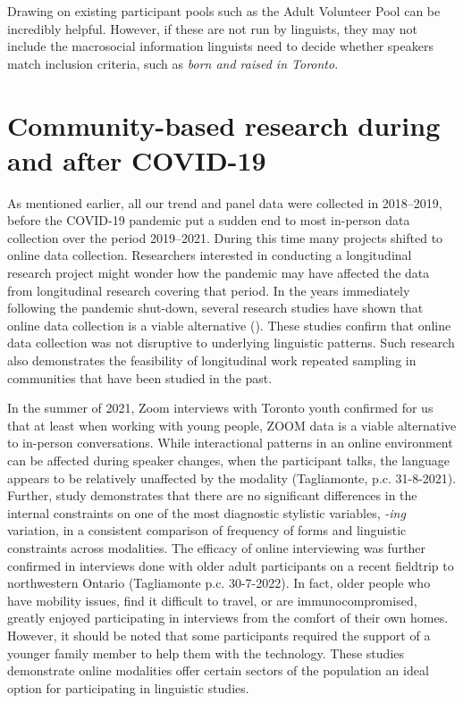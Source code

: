 \documentclass[output=paper]{langscibook}
\begin{document}
Drawing on existing participant pools such as the Adult Volunteer Pool can be incredibly helpful. However, if these are not run by linguists, they may not include the macrosocial information linguists need to decide whether speakers match inclusion criteria, such as \textit{born and raised in Toronto}.

\section{Community-based research during and after COVID-19}
\label{sec:pabst:4}

As mentioned earlier, all our trend and panel data were collected in 2018--2019, before the COVID-19 pandemic put a sudden end to most in-person data collection over the period 2019--2021. During this time many projects shifted to online data collection. Researchers interested in conducting a longitudinal research project might wonder how the pandemic may have affected the data from longitudinal research covering that period. In the years immediately following the pandemic shut-down, several research studies have shown that online data collection is a viable alternative (\citealt{CarmichaelEtAl2022, Hall-LewEtAl2022, LeemanEtAl2020, Sneller2022, SnellerEtAl2022}). These studies confirm that online data collection was not disruptive to underlying linguistic patterns. Such research also demonstrates the feasibility of longitudinal work repeated sampling in communities that have been studied in the past.



In the summer of 2021, Zoom interviews with Toronto youth confirmed for us that at least when working with young people, ZOOM data is a viable alternative to in-person conversations. While interactional patterns in an online environment can be affected during speaker changes, when the participant talks, the language appears to be relatively unaffected by the modality (Tagliamonte, p.c. 31-8-2021). Further,  study demonstrates that there are no significant differences in the internal constraints on one of the most diagnostic stylistic variables, \textit{-ing} variation, in a consistent comparison of frequency of forms and linguistic constraints across modalities. The efficacy of online interviewing was further confirmed in interviews done with older adult participants on a recent fieldtrip to northwestern Ontario (Tagliamonte p.c. 30-7-2022). In fact, older people who have mobility issues, find it difficult to travel, or are immunocompromised, greatly enjoyed participating in interviews from the comfort of their own homes. However, it should be noted that some participants required the support of a younger family member to help them with the technology. These studies demonstrate online modalities offer certain sectors of the population an ideal option for participating in linguistic studies.
\end{document}
